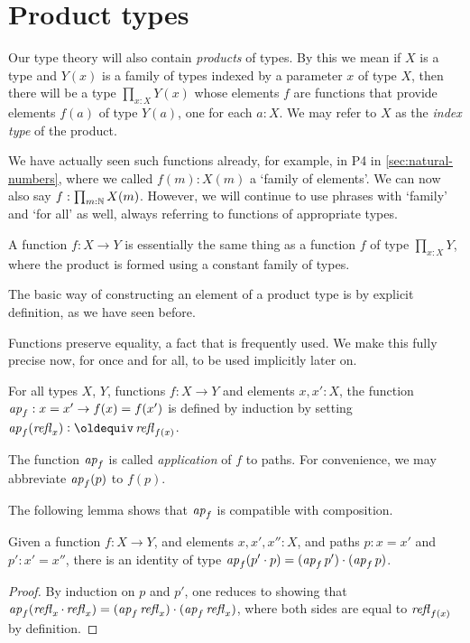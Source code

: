 \section{Product types}
\label{sec:product-types}
Our type theory will also contain \emph{products} of types. 
By this we mean if $X$ is a type and $Y(x)$ is a family of types indexed by a
parameter $x$ of type $X$, then there will be a type $\prod_{x:X} Y(x)$ 
whose elements $f$ are functions that provide elements $f(a)$ of type
$Y(a)$, one for each $a:X$. We may refer to $X$ as the 
\emph{index type} of the product.

We have actually seen such functions already, for example,
in P4 in \cref{sec:natural-numbers}, where
we called $f(m):X(m)$ a `family of elements'. We can now
also say $f: \prod_{m:\mathbb{N}} X(m)$. However, we will continue to use
phrases with `family' and `for all' as well, always referring to functions
of appropriate types.

A function $f : X \to Y$ is essentially the same thing as a function $f$ 
of type $\prod_{x:X} Y$, where the product is formed using a constant family of types.

The basic way of constructing an element of a product type
is by explicit definition, as we have seen before.

Functions preserve equality, a fact that is frequently used.
We make this fully precise now, for once and for all, 
to be used implicitly later on.

\begin{definition}\label{def:ap}
For all types $X$, $Y$, functions $f:X\to Y$ and elements $x,x':X$, the function
$\mathop{{\it ap}_{f}} : x = x' \to f(x) = f(x')$ is defined by induction by setting 
$\ap{f}(\refl{x})\defeq\refl{f(x)}$.
\end{definition}

The function $\mathop{{\it ap}_{f}}$ is called {\em application} of $f$ to paths.  For convenience, we may abbreviate $\mathop{{\it ap}_{f}} (p)$ to $f(p)$.

The following lemma shows that $\mathop{{\it ap}_{f}}$ is compatible with composition.

\begin{lemma}\label{lem:apcomp}
  Given a function $f:X\to Y$, and elements $x,x',x'':X$, and paths $p : x = x'$ and $p' : x' = x''$,
  there is an identity of type $\mathop{{\it ap}_{f}} (p' \cdot p) = ( \mathop{{\it ap}_{f}} p' ) \cdot ( \mathop{{\it ap}_{f}} p )$.
\end{lemma}

\begin{proof}
  By induction on $p$ and $p'$, one reduces to showing that $\mathop{{\it ap}_{f}} (\mathop{{\it refl}_{x}} \cdot \mathop{{\it refl}_{x}}) = ( \mathop{{\it ap}_{f}} \mathop{{\it refl}_{x}} ) \cdot ( \mathop{{\it ap}_{f}} \mathop{{\it refl}_{x}} )$, where
  both sides are equal to $\mathop{{\it refl}_{ f(x) }}$ by definition.
\end{proof}  

